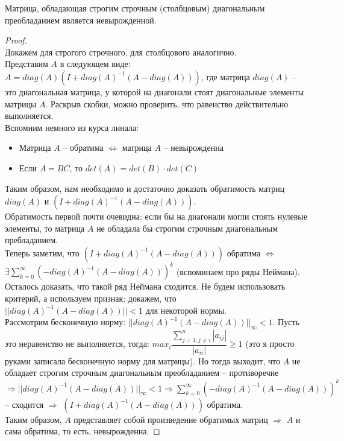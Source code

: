 \begin{theorem*}
    Матрица, обладающая строгим строчным (столбцовым) диагональным
    преобладанием является невырожденной.
\end{theorem*}
\begin{proof} \ \\
    Докажем для строгого строчного, для столбцового аналогично. \\

    Представим $A$ в следующем виде: $A = diag(A)(I + diag(A)^{-1}(A - diag(A)))$,
    где матрица $diag(A)$ -- это диагональная матрица, у которой на диагонали
    стоят диагональные элементы матрицы $A$. Раскрыв скобки, можно проверить,
    что равенство действительно выполняется. \\

    Вспомним немного из курса линала:
    \begin{itemize}
        \item Матрица $A$ -- обратима $\Leftrightarrow$ матрица $A$ -- невырожденна
        \item Если $A = BC$, то $det(A) = det(B) \cdot det(C)$
    \end{itemize}

    Таким образом, нам необходимо и достаточно доказать обратимость матриц
    $diag(A)$ и $(I + diag(A)^{-1}(A - diag(A)))$. \\
    
    Обратимость первой почти очевидна: если бы на диагонали могли стоять
    нулевые элементы, то матрица $A$ не обладала бы строгим строчным диагональным
    пребладанием. \\ 
    
    Теперь заметим, что $(I + diag(A)^{-1}(A - diag(A)))$ обратима $\Leftrightarrow$
    $\exists \sum_{k = 0}^{\infty}(-diag(A)^{-1}(A - diag(A)))^k$ (вспоминаем про ряды Неймана). \\ 

    Осталось доказать, что такой ряд Неймана сходится. Не будем использовать критерий,
    а используем признак: докажем, что $||diag(A)^{-1}(A - diag(A))|| < 1$ для некоторой нормы. \\
    
    Рассмотрим бесконечную норму: $||diag(A)^{-1}(A - diag(A))||_{\infty} < 1$. Пусть это неравенство не выполняется, тогда:
    $\displaystyle max_i \dfrac{\sum_{j = 1, j \neq i}^{n}|a_{ij}|}{|a_{ii}|} \geqslant 1$ (это я просто руками записала
    бесконечную норму для матрицы). Но тогда выходит, что $A$ не обладает строгим строчным
    диагональным преобладанием -- противоречие $\Rightarrow ||diag(A)^{-1}(A - diag(A))||_{\infty} < 1 \Rightarrow
    \sum_{k = 0}^{\infty}(-diag(A)^{-1}(A - diag(A)))^k$ -- сходится $\Rightarrow$
    $(I + diag(A)^{-1}(A - diag(A)))$ обратима. \\

    Таким образом, $A$ представляет собой произведение обратимых матриц $\Rightarrow$ $A$
    и сама обратима, то есть, невырожденна.
\end{proof}
